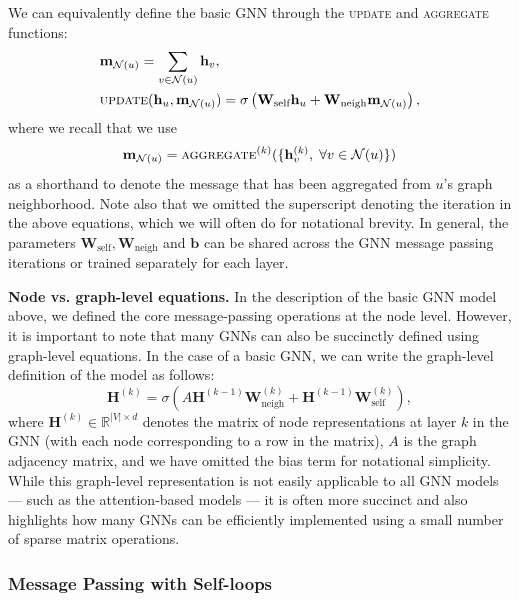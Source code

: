 \documentclass[10pt]{book}
\begin{document}
We can equivalently define the basic GNN through the \textsc{update} and \textsc{aggregate} functions:
\begin{align}
    &\mathbf m_{\mathcal N(u)} = \sum_{v \in \mathcal N(u)} \mathbf h_v, 
    \label{eq:basicgnn} \\
    &\textsc{update}(\mathbf h_u, \mathbf m_{\mathcal N(u)}) = \sigma \left( \mathbf W_\text{self} \mathbf h_u + \mathbf W_\text{neigh} \mathbf m_{\mathcal N(u)} \right),
\end{align}
where we recall that we use
\begin{equation}
    \mathbf m_{\mathcal N(u)} = \textsc{aggregate}^{(k)}(\{ \mathbf h_v^{(k)}, \; \forall v \in \mathcal N(u)\})
\end{equation}
as a shorthand to denote the message that has been aggregated from $u$'s graph neighborhood. Note also that we omitted the superscript denoting the iteration in the above equations, which we will often do for notational brevity. In general, the parameters $\mathbf W_\text{self}, \mathbf W_\text{neigh}$ and $\mathbf b$ can be shared across the GNN message passing iterations or trained separately for each layer.

\textbf{Node vs. graph-level equations.} In the description of the basic GNN model above, we defined the core message-passing operations at the node level. However, it is important to note that many GNNs can also be succinctly defined using graph-level equations. In the case of a basic GNN, we can write the graph-level definition of the model as follows:
\begin{equation}
    \mathbf H^{(k)} = \sigma \left( A \mathbf H^{(k-1)} \mathbf W_\text{neigh}^{(k)} + \mathbf H^{(k-1)} \mathbf W_\text{self}^{(k)} \right),
\end{equation}
where $\mathbf H^{(k)} \in \mathbb R^{|V| \times d}$ denotes the matrix of node representations at layer $k$ in the GNN (with each node corresponding to a row in the matrix), $A$ is the graph adjacency matrix, and we have omitted the bias term for notational simplicity. While this graph-level representation is not easily applicable to all GNN models --- such as the attention-based models --- it is often more succinct and also highlights how many GNNs can be efficiently implemented using a small number of sparse matrix operations.

\subsubsection{Message Passing with Self-loops}
\end{document}
